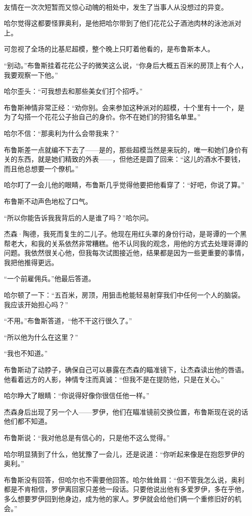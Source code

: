 \documentclass[../main.tex]{subfiles}
\begin{document}
~\

友情在一次次短暂而又惊心动魄的相处中，发生了当事人从没想过的异变。

哈尔觉得这都要怪罪奥利，是他把哈尔带到了他们花花公子酒池肉林的泳池派对上。

可忽视了全场的比基尼超模，整个晚上只盯着他看的，是布鲁斯本人。

“别动。”布鲁斯挂着花花公子的微笑这么说，“你身后大概五百米的房顶上有个人，我要观察一下他。”

哈尔歪头：“可我想去和那些美女们打个招呼。”

布鲁斯神情非常正经：“劝你别。会来参加这种派对的超模，十个里有十一个，是为了勾搭一个花花公子抬自己的身价。你不在她们的狩猎名单里。”

哈尔不信：“那奥利为什么会带我来？”

布鲁斯差一点就编不下去了——是的，那些超模当然是来玩的，唯一和她们身价有关的东西，就是她们精致的外表——，但他还是圆了回来：“这儿的酒水不要钱，而且他总想要一个僚机。”

哈尔盯了一会儿他的眼睛，布鲁斯几乎觉得他要把他看穿了：“好吧，你说了算。”

布鲁斯不动声色地松了口气。

“所以你能告诉我我背后的人是谁了吗？”哈尔问。

杰森·陶德，我死而复生的二儿子。他现在用红头罩的身份行动，是哥谭的一个黑帮老大，和我的关系依然非常糟糕。他不认同我的观念，用他的方式去处理哥谭的问题。我依然很关心他，但我每次试图接近他，结果都是因为一些更重要的事情，我把他推得更远。

“一个前雇佣兵。”他最后答道。

哈尔顿了一下：“五百米，房顶，用狙击枪能轻易射穿我们中任何一个人的脑袋。我应该开始担心吗？”

“不用。”布鲁斯答道，“他不干这行很久了。”

“所以他为什么在这里？”

“我也不知道。”

布鲁斯动了动脖子，确保自己可以暴露在杰森的瞄准镜下，让杰森读出他的唇语。他看着远方的人影，神情专注而真诚：“但我不是在提防他，只是在关心。”

哈尔睁大了眼睛：“你说得好像你很信任他一样。”

杰森身后出现了另一个人——罗伊，他们在瞄准镜前交换位置，布鲁斯现在说的话他们都不知道。

布鲁斯说：“我对他总是有信心的，只是他不这么觉得。”

哈尔明显猜到了什么，他犹豫了一会儿，还是说道：“你听起来像是在抱怨罗伊的奥利。”

布鲁斯没有回答，但哈尔也不需要他回答。哈尔耸耸肩：“但不管我怎么说，奥利都是不肯相信，罗伊离回家只差他一段话。只要他说出他有多爱罗伊，多在乎他，多么想要罗伊回到他身边，成为他的家人。罗伊就会给他们俩一个重修旧好的机会。”
\end{document}
